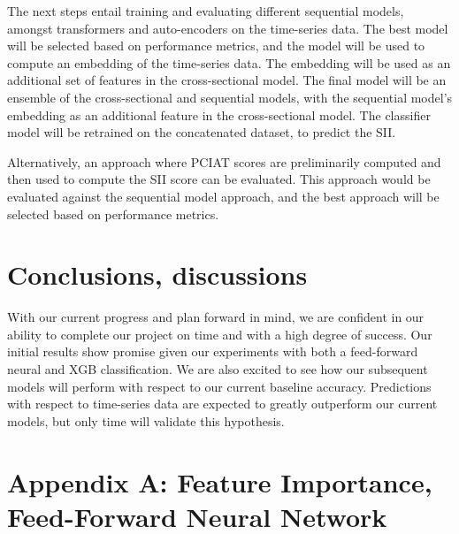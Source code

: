 \documentclass[11pt]{extarticle}
\begin{document}
The next steps entail training and evaluating different sequential models, amongst transformers and auto-encoders on the time-series data. 
The best model will be selected based on performance metrics, and the model will be used to compute an embedding of the time-series data. 
The embedding will be used as an additional set of features in the cross-sectional model. 
The final model will be an ensemble of the cross-sectional and sequential models, with the sequential model's embedding as an additional feature in the cross-sectional model. 
The classifier model will be retrained on the concatenated dataset, to predict the SII.

Alternatively, an approach where PCIAT scores are preliminarily computed and then used to compute the SII score can be evaluated. 
This approach would be evaluated against the sequential model approach, and the best approach will be selected based on performance metrics.

\section{Conclusions, discussions}

    With our current progress and plan forward in mind, we are confident in our ability to complete our project on time and with a high degree of success.
    Our initial results show promise given our experiments with both a feed-forward neural and XGB classification.
    We are also excited to see how our subsequent models will perform with respect to our current baseline accuracy.
    Predictions with respect to time-series data are expected to greatly outperform our current models, but only time will validate this hypothesis.

\pagebreak




\pagebreak

\section*{Appendix A: Feature Importance, Feed-Forward Neural Network}
\end{document}
